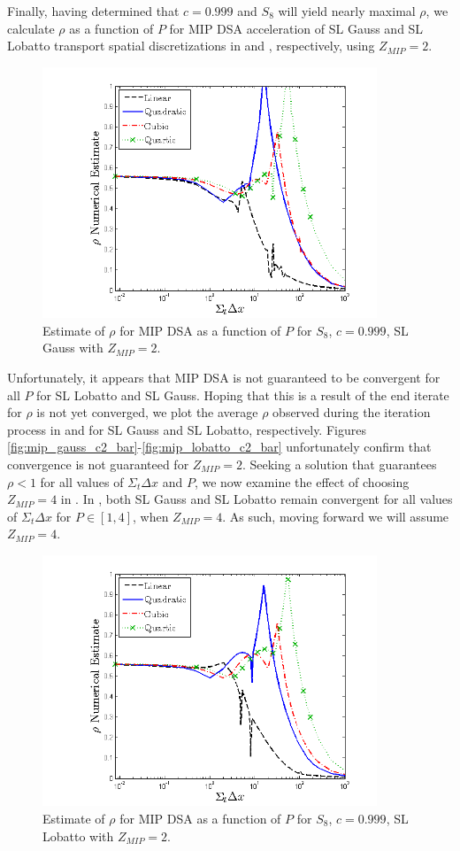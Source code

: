 Finally, having determined that $c=0.999$ and $S_8$ will yield nearly maximal $\rho$, we calculate $\rho$ as a function of $P$ for MIP DSA acceleration of SL Gauss and SL Lobatto transport spatial discretizations in  and , respectively, using $Z_{MIP}=2$.  
\begin{figure}[!htp]
\centering
\includegraphics[width=10cm]{chapter4_acceleration/Const_2_Constant_XS_SN8_MIP_Gauss.png}
\caption{Estimate of $\rho$ for MIP DSA as a function of $P$ for  $S_8$, $c=0.999$, SL Gauss with $Z_{MIP}=2$.}
\label{fig:mip_gauss}
\end{figure}
%
Unfortunately, it appears that MIP DSA is not guaranteed to be convergent for all $P$ for SL Lobatto and SL Gauss.  
Hoping that this is a result of the end iterate for $\rho$ is not yet converged, we plot the average $\rho$ observed during the iteration process in  and  for SL Gauss and SL Lobatto, respectively.  
Figures \ref{fig:mip_gauss_c2_bar}-\ref{fig:mip_lobatto_c2_bar} unfortunately confirm that convergence is not guaranteed for $Z_{MIP}=2$.
Seeking a solution that guarantees $\rho < 1$ for all values of $\Sigma_t \Delta x$ and $P$, we now examine the effect of choosing $Z_{MIP}=4$ in .
In , both SL Gauss and SL Lobatto remain convergent for all values of $\Sigma_t \Delta x$ for $P\in[1,4]$, when $Z_{MIP}=4$.  
As such, moving forward we will assume $Z_{MIP} = 4$.
%
\begin{figure}[!htp]
\centering
\includegraphics[width=10cm]{chapter4_acceleration/Const_2_Constant_XS_SN8_MIP_Lobatto.png}
\caption{Estimate of $\rho$ for MIP DSA as a function of $P$ for $S_8$, $c=0.999$,  SL Lobatto with $Z_{MIP}=2$.}
\label{fig:mip_lobatto}
\end{figure}
